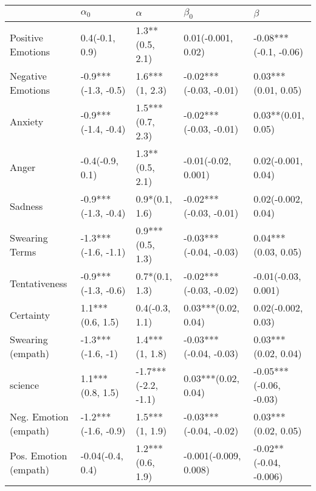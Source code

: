 \begin{tabular}{lllll}
\toprule
{} &           $\alpha_0$ &             $\alpha$ &               $\beta_0$ &                 $\beta$ \\
\midrule
Positive Emotions     &       0.4(-0.1, 0.9) &      1.3**(0.5, 2.1) &      0.01(-0.001, 0.02) &   -0.08***(-0.1, -0.06) \\
Negative Emotions     &  -0.9***(-1.3, -0.5) &       1.6***(1, 2.3) &  -0.02***(-0.03, -0.01) &     0.03***(0.01, 0.05) \\
Anxiety               &  -0.9***(-1.4, -0.4) &     1.5***(0.7, 2.3) &  -0.02***(-0.03, -0.01) &      0.03**(0.01, 0.05) \\
Anger                 &      -0.4(-0.9, 0.1) &      1.3**(0.5, 2.1) &     -0.01(-0.02, 0.001) &      0.02(-0.001, 0.04) \\
Sadness               &  -0.9***(-1.3, -0.4) &       0.9*(0.1, 1.6) &  -0.02***(-0.03, -0.01) &      0.02(-0.002, 0.04) \\
Swearing Terms        &  -1.3***(-1.6, -1.1) &     0.9***(0.5, 1.3) &  -0.03***(-0.04, -0.03) &     0.04***(0.03, 0.05) \\
Tentativeness         &  -0.9***(-1.3, -0.6) &       0.7*(0.1, 1.3) &  -0.02***(-0.03, -0.02) &     -0.01(-0.03, 0.001) \\
Certainty             &     1.1***(0.6, 1.5) &       0.4(-0.3, 1.1) &     0.03***(0.02, 0.04) &      0.02(-0.002, 0.03) \\
Swearing (empath)     &    -1.3***(-1.6, -1) &       1.4***(1, 1.8) &  -0.03***(-0.04, -0.03) &     0.03***(0.02, 0.04) \\
science               &     1.1***(0.8, 1.5) &  -1.7***(-2.2, -1.1) &     0.03***(0.02, 0.04) &  -0.05***(-0.06, -0.03) \\
Neg. Emotion (empath) &  -1.2***(-1.6, -0.9) &       1.5***(1, 1.9) &  -0.03***(-0.04, -0.02) &     0.03***(0.02, 0.05) \\
Pos. Emotion (empath) &     -0.04(-0.4, 0.4) &     1.2***(0.6, 1.9) &   -0.001(-0.009, 0.008) &  -0.02**(-0.04, -0.006) \\
\bottomrule
\end{tabular}
